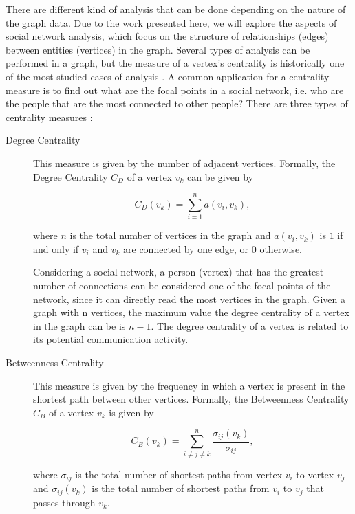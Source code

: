 There are different kind of analysis that can be done depending on the nature of the graph data. Due to the work presented here, we will explore the aspects of social network analysis, which focus on the structure of relationships (edges) between entities (vertices) in the graph. Several types of analysis can be performed in a graph, but the measure of a vertex's centrality is historically one of the most studied cases of analysis \cite{Freeman1978}. A common application for a centrality measure is to find out what are the focal points in a social network, i.e. who are the people that are the most connected to other people? There are three types of centrality measures \cite{Freeman1978}:

\begin{description}
\item[Degree Centrality] This measure is given by the number of adjacent vertices. Formally, the Degree Centrality $C_D$ of a vertex $v_k$ can be given by

\begin{equation}
C_D(v_k) = \sum_{i=1}^{n} a(v_i, v_k),
\end{equation}

where $n$ is the total number of vertices in the graph and $a(v_i, v_k)$ is $1$ if and only if $v_i$ and $v_k$ are connected by one edge, or $0$ otherwise.

Considering a social network, a person (vertex) that has the greatest number of connections can be considered one of the focal points of the network, since it can directly read the most vertices in the graph. Given a graph with n vertices, the maximum value the degree centrality of a vertex in the graph can be is $n-1$. The degree centrality of a vertex is related to its potential communication activity.

\item[Betweenness Centrality] This measure is given by the frequency in which a vertex is present in the shortest path between other vertices. Formally, the Betweenness Centrality $C_B$ of a vertex $v_k$ is given by

\begin{equation}
C_B(v_k) = \sum_{i \neq j \neq k}^{n} \frac{\sigma_{ij}(v_k)}{\sigma_{ij}},
\end{equation}

where $\sigma_{ij}$ is the total number of shortest paths from vertex $v_i$ to vertex $v_j$ and $\sigma_{ij}(v_k)$ is the total number of shortest paths from $v_i$ to $v_j$ that passes through $v_k$.


\end{description}
